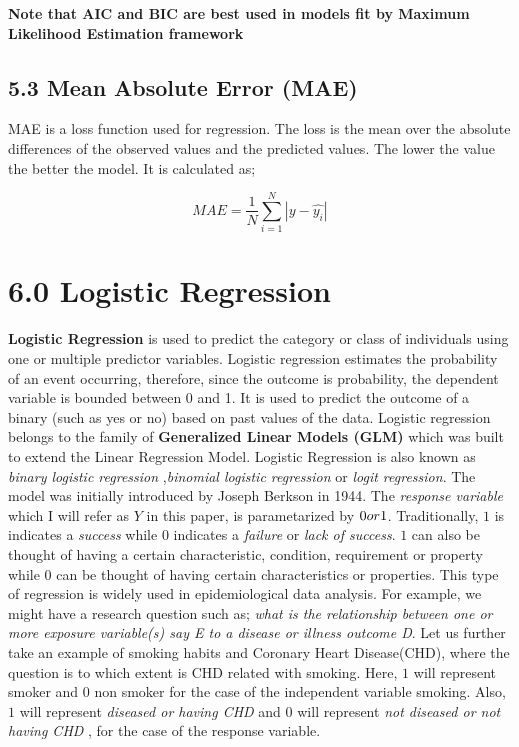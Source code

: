\documentclass[
]{article}
\begin{document}
\textbf{Note that AIC and BIC are best used in models fit by Maximum
Likelihood Estimation framework}

\hypertarget{mean-absolute-error-mae}{%
\subsection{5.3 Mean Absolute Error
(MAE)}\label{mean-absolute-error-mae}}

MAE is a loss function used for regression. The loss is the mean over
the absolute differences of the observed values and the predicted
values. The lower the value the better the model. It is calculated as;

\[MAE=\frac{1}{N}\sum_{i=1}^N|y-\hat{y_i}|\]

\newpage

\hypertarget{logistic-regression}{%
\section{6.0 Logistic Regression}\label{logistic-regression}}

\textbf{Logistic Regression} is used to predict the category or class of
individuals using one or multiple predictor variables. Logistic
regression estimates the probability of an event occurring, therefore,
since the outcome is probability, the dependent variable is bounded
between 0 and 1. It is used to predict the outcome of a binary (such as
yes or no) based on past values of the data. Logistic regression belongs
to the family of \textbf{Generalized Linear Models (GLM)} which was
built to extend the Linear Regression Model. Logistic Regression is also
known as \emph{binary logistic regression} ,\emph{binomial logistic
regression} or \emph{logit regression}. The model was initially
introduced by Joseph Berkson in 1944. The \emph{response variable} which
I will refer as \(Y\) in this paper, is parametarized by
\(0\space or\space 1\). Traditionally, \(1\) is indicates a
\emph{success} while \(0\) indicates a \emph{failure} or \emph{lack of
success}. \(1\) can also be thought of having a certain characteristic,
condition, requirement or property while \(0\) can be thought of having
certain characteristics or properties. This type of regression is widely
used in epidemiological data analysis. For example, we might have a
research question such as; \emph{what is the relationship between one or
more exposure variable(s) say E to a disease or illness outcome D}. Let
us further take an example of smoking habits and Coronary Heart
Disease(CHD), where the question is to which extent is CHD related with
smoking. Here, \(1\) will represent smoker and \(0\) non smoker for the
case of the independent variable smoking. Also, \(1\) will represent
\emph{diseased or having CHD} and \(0\) will represent \emph{not
diseased or not having CHD} , for the case of the response variable.
\end{document}
